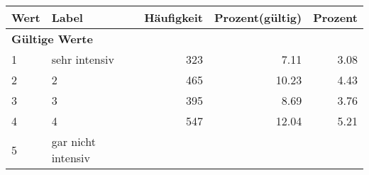      \begin{longtable}{lXrrr}
     \toprule
     \textbf{Wert} & \textbf{Label} & \textbf{Häufigkeit} & \textbf{Prozent(gültig)} & \textbf{Prozent} \\
     \endhead
     \midrule
     \multicolumn{5}{l}{\textbf{Gültige Werte}}\\

     1 &
     \multicolumn{1}{X}{ sehr intensiv   } &


       \num{323} &
       \num[round-mode=places,round-precision=2]{7.11} &
         \num[round-mode=places,round-precision=2]{3.08} \\

     2 &
     \multicolumn{1}{X}{ 2   } &


       \num{465} &
       \num[round-mode=places,round-precision=2]{10.23} &
         \num[round-mode=places,round-precision=2]{4.43} \\

     3 &
     \multicolumn{1}{X}{ 3   } &


       \num{395} &
       \num[round-mode=places,round-precision=2]{8.69} &
         \num[round-mode=places,round-precision=2]{3.76} \\

     4 &
     \multicolumn{1}{X}{ 4   } &


       \num{547} &
       \num[round-mode=places,round-precision=2]{12.04} &
         \num[round-mode=places,round-precision=2]{5.21} \\

     5 &
     \multicolumn{1}{X}{ gar nicht intensiv   } &



\end{longtable}

